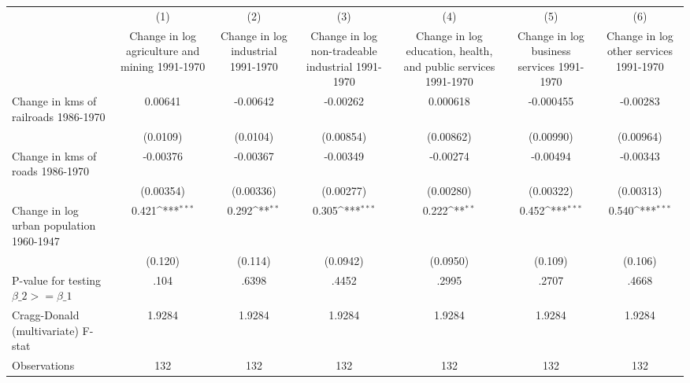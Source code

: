 {
\def\sym#1{\ifmmode^{#1}\else\(^{#1}\)\fi}
\begin{tabular}{l*{6}{c}}
\hline\hline
                &\multicolumn{1}{c}{(1)}&\multicolumn{1}{c}{(2)}&\multicolumn{1}{c}{(3)}&\multicolumn{1}{c}{(4)}&\multicolumn{1}{c}{(5)}&\multicolumn{1}{c}{(6)}\\
                &\multicolumn{1}{c}{Change in log agriculture and mining 1991-1970}&\multicolumn{1}{c}{Change in log industrial 1991-1970}&\multicolumn{1}{c}{Change in log non-tradeable industrial 1991-1970}&\multicolumn{1}{c}{Change in log education, health, and public services 1991-1970}&\multicolumn{1}{c}{Change in log business services 1991-1970}&\multicolumn{1}{c}{Change in log other services 1991-1970}\\
\hline
Change in kms of railroads 1986-1970&  0.00641         & -0.00642         & -0.00262         & 0.000618         &-0.000455         & -0.00283         \\
                & (0.0109)         & (0.0104)         &(0.00854)         &(0.00862)         &(0.00990)         &(0.00964)         \\
[1em]
Change in kms of roads 1986-1970& -0.00376         & -0.00367         & -0.00349         & -0.00274         & -0.00494         & -0.00343         \\
                &(0.00354)         &(0.00336)         &(0.00277)         &(0.00280)         &(0.00322)         &(0.00313)         \\
[1em]
Change in log urban population 1960-1947&    0.421\sym{***}&    0.292\sym{**} &    0.305\sym{***}&    0.222\sym{**} &    0.452\sym{***}&    0.540\sym{***}\\
                &  (0.120)         &  (0.114)         & (0.0942)         & (0.0950)         &  (0.109)         &  (0.106)         \\
\hline
P-value for testing $\beta\_{2} >= \beta\_{1}$&     .104         &    .6398         &    .4452         &    .2995         &    .2707         &    .4668         \\
Cragg-Donald (multivariate) F-stat&   1.9284         &   1.9284         &   1.9284         &   1.9284         &   1.9284         &   1.9284         \\
Observations    &      132         &      132         &      132         &      132         &      132         &      132         \\
\hline\hline
\end{tabular}
}

